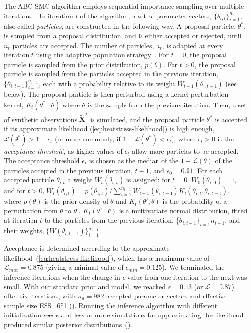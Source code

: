 \documentclass[12pt]{extarticle}
\let\vec\mathbf
\newcommand{\likelihood}{\mathcal{L}}
\begin{document}
The ABC-SMC algorithm employs sequential importance sampling over multiple iterations~\citep{Toni2009, Klinger2017, Syga2021}.
In iteration $t$ of the algorithm, a set of parameter vectors, $\{\theta_{i,t}\}_{i=1}^{n_t}$, also called \emph{particles}, are constructed in the following way.
A proposal particle, $\theta^*$, is sampled from a proposal distribution, and is either accepted or rejected, until $n_t$ particles are accepted.
The number of particles, $n_t$, is adapted at every iteration $t$ using the adaptive population strategy~\citep[\href{https://pyabc.readthedocs.io}{pyabc.readthedocs.io}]{Klinger2018}.
For $t=0$, the proposal particle is sampled from the prior distribution, $p(\theta)$.
For $t>0$, the proposal particle is sampled from the particles accepted in the previous iteration, $\{\theta_{i,t-1}\}_{i=1}^{n_{t-1}}$, each with a probability relative to its weight $W_{t-1}(\theta_{i,t-1})$ (see below). The proposal particle is then perturbed using a kernel perturbation kernel, $K_t(\theta^* \mid \theta)$ where $\theta$ is the sample from the previous iteration.
Then, a set of synthetic observations $\tilde{\vec X}^*$ is simulated, and the proposal particle $\theta^*$ is accepted if its approximate likelihood (\cref{eq:heatstress-likelihood}) is high enough, $\likelihood(\theta^*)>1-\epsilon_t$ (or more commonly, if $1-\likelihood(\theta^*) < \epsilon_t$), where $\epsilon_t>0$ is the \emph{acceptance threshold}, as higher values of $\epsilon_t$ allow more particles to be accepted. 
The acceptance threshold $\epsilon_t$ is chosen as the median of the $1-\likelihood(\theta)$ of the particles accepted in the previous iteration, $t-1$, and $\epsilon_0=0.01$. 
For each accepted particle $\theta_{i,t}$ a weight $W_t(\theta_{i,t})$ is assigned: for $t=0$, $W_0(\theta_{i,0})=1$, and for $t>0$, 
$W_t(\theta_{i,t}) = p(\theta_{i,t}) / \sum_{i=1}^{n_{t-1}}{W_{t-1}(\theta_{i,t-1}) K_t(\theta_{i,t}, \theta_{i,t-1})}$, where $p(\theta)$ is the prior density of $\theta$ and $K_t(\theta', \theta)$ is the probability of a perturbation from $\theta$ to $\theta'$.
$K_t(\theta' \mid \theta)$ is a multivariate normal distribution, fitted at iteration $t$ to the particles from the previous iteration, \{$\theta_{i,t-1}\}_{i=1}{n_{t-1}}$, and their weights, $\{W(\theta_{i,t-1})\}_{i=1}^{n_{t-1}}$.

Acceptance is determined according to the approximate likelihood~(\cref{eq:heatstress-likelihood}), which has a maximum value of $\likelihood_{max}=0.875$ (giving a minimal value of $\epsilon_{min}=0.125$). We terminated the inference iterations when the change in $\epsilon$ value from one iteration to the next was small.
With our standard prior and model, we reached $\epsilon=0.13$ (or $\likelihood=0.87$) after six iterations, with $n_6=982$ accepted parameter vectors and effective sample size ESS=651 (). Running the inference algorithm with different initialization seeds and less or more simulations for approximating the likelihood produced similar posterior distributions~(). 
\end{document}

